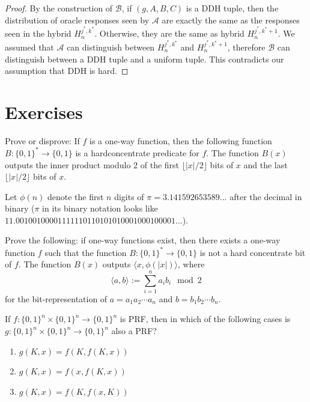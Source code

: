 \documentclass[12pt]{tufte-book}
\newcommand{\bit}{\{0,1\}}
\begin{document}
\begin{proof}
    By the construction of $\mathcal{B}$, if $(g, A, B, C)$ is a DDH tuple, then the distribution of oracle responses seen by $\mathcal{A}$ are exactly the same as the responses seen in the hybrid $H_n^{j^*, k^*}$. Otherwise, they are the same as hybrid $H_n^{j^*, k^*+1}$.
    We assumed that $\mathcal{A}$ can distinguish between $H_n^{j^*, k^*}$ and $H_n^{j^*, k^*+1}$, therefore $\mathcal{B}$ can distinguish between a DDH tuple and a uniform tuple. This contradicts our assumption that DDH is hard.

\end{proof}


\newpage
\section*{Exercises}
\begin{exercise}


    Prove or disprove: If $f$ is a one-way function, then the following function $B:\bit^*\to\bit$ is a hardconcentrate predicate for $f$. The function $B(x)$ outputs the inner product modulo 2 of the first $\lfloor |x|/2\rfloor$ bits of $x$ and the last $\lfloor |x|/2\rfloor$ bits of $x$.
\end{exercise}

\begin{exercise}
    Let $\phi(n)$ denote the first $n$ digits of $\pi = 3.141592653589\ldots$ after the decimal in binary ($\pi$ in its binary notation looks like $11.00100100001111110110101010001000100001\ldots$).

    Prove the following: if one-way functions exist, then there exists a one-way function $f$ such that the function $B:\{0,1\}^* \rightarrow \{0,1\}$ is not a hard concentrate bit of $f$. The function $B(x)$ outputs $\langle x, \phi(|x|)\rangle$, where
    \[\langle a, b\rangle := \sum_{i=1}^n a_i b_i \mod 2\]
    for the bit-representation of $a = {a_1a_2\cdots a_n}$ and $b= {b_1b_2\cdots b_n}$.
\end{exercise}

\begin{exercise}
    If $f: \{0,1\}^{n}\times \{0,1\}^n\rightarrow \{0,1\}^n$  is PRF, then in which of the following cases is $g: \{0,1\}^{n}\times \{0,1\}^n\rightarrow \{0,1\}^n$ also a PRF? \begin{enumerate} \item $g(K,x) = f(K,f(K,x))$ \item $g(K,x) = f(x,f(K,x))$ \item $g(K,x) = f(K,f(x,K))$
    \end{enumerate}
\end{exercise}
\end{document}
